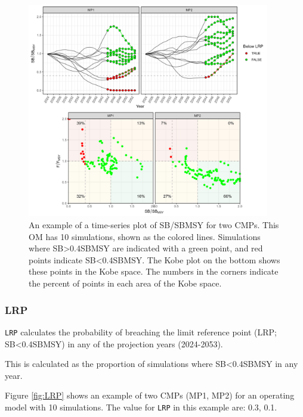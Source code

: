 \documentclass[
]{article}
\begin{document}
\begin{figure}
\includegraphics[width=400px]{../../img/PMs/LRP_long} \caption{An example of a time-series plot of SB/SBMSY for two CMPs. This OM has 10 simulations, shown as the colored lines. Simulations where SB>0.4SBMSY are indicated with a green point, and red points indicate SB<0.4SBMSY. The Kobe plot on the bottom shows these points in the Kobe space. The numbers in the corners indicate the percent of points in each area of the Kobe space.}\label{fig:LRP-long}
\end{figure}

\hypertarget{lrp}{%
\subsubsection{LRP}\label{lrp}}

\texttt{LRP} calculates the probability of breaching the limit reference point (LRP; SB\textless0.4SBMSY) in any of the projection years (2024-2053).

This is calculated as the proportion of simulations where SB\textless0.4SBMSY in any year.

Figure \ref{fig:LRP} shows an example of two CMPs (MP1, MP2) for an operating model with 10 simulations. The value for \texttt{LRP} in this example are: 0.3, 0.1.
\end{document}
